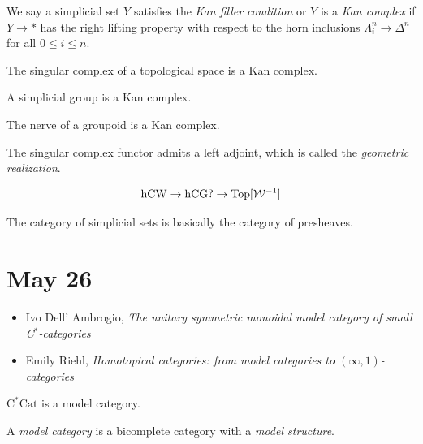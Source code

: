 \documentclass{../../../small}
\begin{document}
\begin{prb}
We say a simplicial set $Y$ satisfies the \emph{Kan filler condition} or $Y$ is a \emph{Kan complex} if $Y\to*$ has the right lifting property with respect to the horn inclusions $\Lambda_i^n\to\Delta^n$ for all $0\le i\le n$.

\begin{parts}
\item The singular complex of a topological space is a Kan complex.
\item A simplicial group is a Kan complex.
\item The nerve of a groupoid is a Kan complex.
\item The singular complex functor admits a left adjoint, which is called the \emph{geometric realization}.
\end{parts}
\end{prb}


\[\operatorname{hCW}\to\operatorname{hCG?}\to\operatorname{Top}[\mathcal{W}^{-1}]\]

The category of simplicial sets is basically the category of presheaves.


\newpage
\section{May 26}


\begin{itemize}
\item Ivo Dell' Ambrogio, \textit{The unitary symmetric monoidal model category of small C$^*$-categories}
\item Emily Riehl, \textit{Homotopical categories: from model categories to $(\infty,1)$-categories}
\end{itemize}


\begin{theorem*}
$\mathrm{C^*Cat}$ is a model category.
\end{theorem*}

\begin{definition*}
A \emph{model category} is a bicomplete category with a \emph{model structure}.
\end{definition*}
\end{document}
